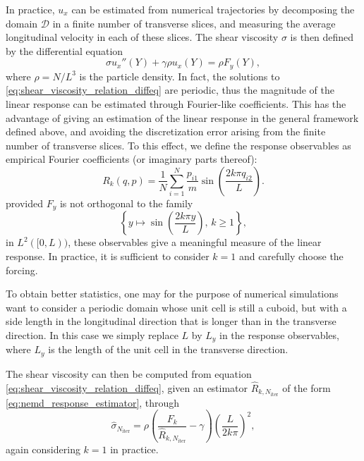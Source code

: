 In practice, $u_x$ can be estimated from numerical trajectories by decomposing the domain $\mathcal D$ in a finite number of transverse slices,
 and measuring the average longitudinal velocity in each of these slices.
 The shear viscosity $\sigma$ is then defined by the differential equation
\begin{equation}
    \label{eq:shear_viscosity_relation_diffeq}
    \sigma u_x''(Y)+\gamma \rho u_x(Y)=\rho F_y(Y),
\end{equation}
where $\rho= N/L^3$ is the particle density.
In fact, the solutions to \eqref{eq:shear_viscosity_relation_diffeq} are periodic, thus the magnitude of the linear response can be estimated through Fourier-like coefficients.
This has the advantage of giving an estimation of the linear response in the general framework defined above, and avoiding the discretization error arising from the finite number of transverse slices.
To this effect, we define the response observables as empirical Fourier coefficients (or imaginary parts thereof):
\begin{equation}
    \label{eq:nemd_shear_viscosity_response}
    R_k(q,p)=\frac{1}N\sum_{i=1}^N\frac{p_{i1}}{m}\sin\left(\frac{2k\pi q_{i2}}{L}\right).
\end{equation}
provided $F_y$ is not orthogonal to the family
\[\left\{ y\mapsto \sin\left(\frac{2k\pi y}{L}\right),\,k\geq 1\right\} ,\]
in $L^2([0,L))$, these observables give a meaningful measure of the linear response. In practice, it is sufficient to consider $k=1$ and carefully choose the forcing.
\begin{remark}
    To obtain better statistics, one may for the purpose of numerical simulations want to consider a periodic domain whose unit cell is still a cuboid, but with a side length in the longitudinal direction that is longer than in the transverse direction.
    In this case we simply replace $L$ by $L_y$ in the response observables, where $L_y$ is the length of the unit cell in the transverse direction.
\end{remark}
The shear viscosity can then be computed from equation \eqref{eq:shear_viscosity_relation_diffeq}, given an estimator $\widehat{R}_{k,N_{\mathrm{iter}}}$ of the form \eqref{eq:nemd_response_estimator}, through
\begin{equation}
    \label{eq:shear_viscosity_nemd_estimator}
    \hat{\sigma}_{N_{\mathrm{iter}}}=\rho\left(\frac{F_k}{\widehat{R}_{k,N_{\mathrm{iter}}}}-\gamma\right)\left(\frac{L}{2k\pi}\right)^2,
\end{equation}
again considering $k=1$ in practice.
